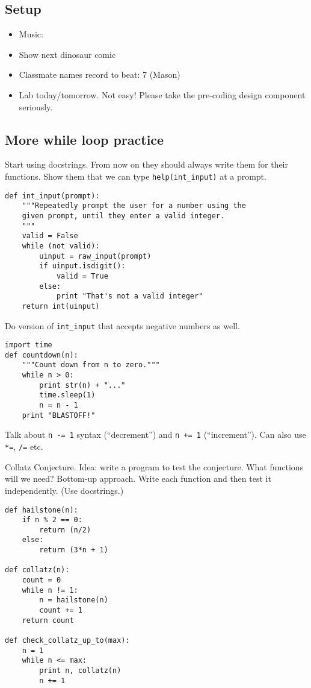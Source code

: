 \documentclass{article}
\begin{document}
\subsection*{Setup}
\begin{itemize}
\item Music:
\item Show next dinosaur comic
\item Classmate names record to beat: 7 (Mason)
\item Lab today/tomorrow.  Not easy!  Please take the pre-coding
  design component seriously.
\end{itemize}

\subsection*{More while loop practice}

Start using docstrings.  From now on they should always write them for
their functions.  Show them that we can type \verb|help(int_input)| at
a prompt.
\begin{verbatim}
def int_input(prompt):
    """Repeatedly prompt the user for a number using the
    given prompt, until they enter a valid integer.
    """
    valid = False
    while (not valid):
        uinput = raw_input(prompt)
        if uinput.isdigit():
            valid = True
        else:
            print "That's not a valid integer"
    return int(uinput)
\end{verbatim}

Do version of \verb|int_input| that accepts negative numbers as well.

\begin{verbatim}
import time
def countdown(n):
    """Count down from n to zero."""
    while n > 0:
        print str(n) + "..."
        time.sleep(1)
        n = n - 1
    print "BLASTOFF!"
\end{verbatim}

Talk about \verb|n -= 1| syntax (``decrement'') and \verb|n += 1|
(``increment'').  Can also use \verb|*=|, \verb|/=| etc.

Collatz Conjecture.  Idea: write a program to test the conjecture.
What functions will we need?  Bottom-up approach.  Write each function
and then test it independently.  (Use docstrings.)
\begin{verbatim}
def hailstone(n):
    if n % 2 == 0:
        return (n/2)
    else:
        return (3*n + 1)

def collatz(n):
    count = 0
    while n != 1:
        n = hailstone(n)
        count += 1
    return count

def check_collatz_up_to(max):
    n = 1
    while n <= max:
        print n, collatz(n)
        n += 1
\end{verbatim}
\end{document}
